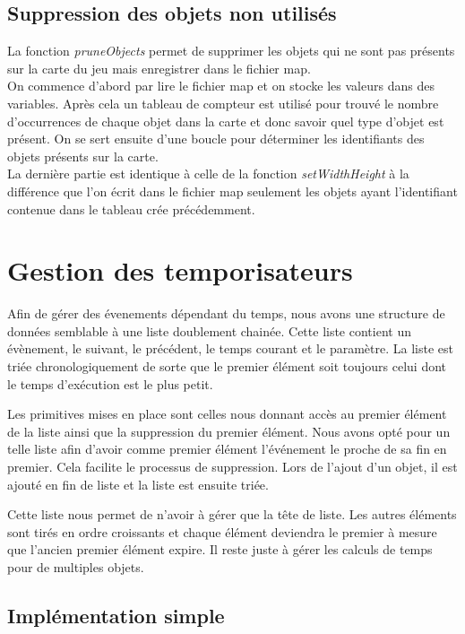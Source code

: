 \documentclass[10pt,a4paper]{article}
\begin{document}
\subsection{Suppression des objets non utilisés}
\quad La fonction \textit{pruneObjects} permet de supprimer les objets qui ne sont pas présents sur la carte du jeu mais enregistrer dans le fichier map.\\
\quad On commence d'abord par lire le fichier map et on stocke les valeurs dans des variables. Après cela un tableau de compteur est utilisé pour trouvé le nombre d'occurrences de chaque objet dans la carte et donc savoir quel type d'objet est présent. On se sert ensuite d'une boucle pour déterminer les identifiants des objets présents sur la carte.\\
La dernière partie est identique à celle de la fonction \textit{setWidthHeight} à la différence que l'on écrit dans le fichier map seulement les objets ayant l'identifiant contenue dans le tableau crée précédemment.
 
\section{Gestion des temporisateurs}

	Afin de gérer des évenements dépendant du temps, nous avons une structure de données semblable à une liste doublement chainée. Cette liste contient un évènement, le suivant, le précédent, le temps courant et le paramètre. La liste est triée chronologiquement de sorte que le premier élément soit toujours celui dont le temps d'exécution est le plus petit. 
	
	Les primitives mises en place sont celles nous donnant accès au premier élément de la liste ainsi que la suppression du premier élément. Nous avons opté pour un telle liste afin d'avoir comme premier élément l'événement le proche de sa fin en premier. Cela facilite le processus de suppression. Lors de l'ajout d'un objet, il est ajouté en fin de liste et la liste est ensuite triée.
	
	Cette liste nous permet de n'avoir à gérer que la tête de liste. Les autres éléments sont tirés en ordre croissants et chaque élément deviendra le premier à mesure que l'ancien premier élément expire. Il reste juste à gérer les calculs de temps pour de multiples objets.

\subsection{Implémentation simple}
\end{document}
